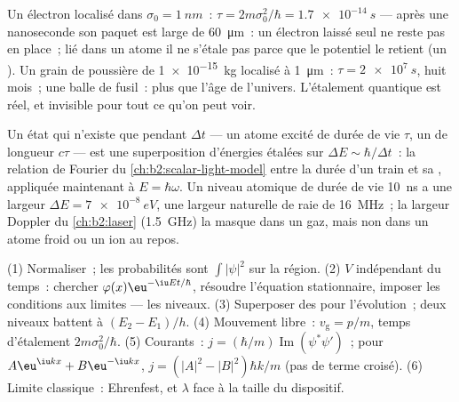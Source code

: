 \begin{example}\label{ex:b2:schrodinger-wave-functions:spreading}
Un électron localisé dans $\sigma_0 = \qty{1}{nm}$~: $\tau = 2m\sigma_0^2/\hbar
= \qty{1.7e-14}{s}$ --- après une nanoseconde son paquet est large de \qty{60}{\micro m}~:
un électron laissé seul ne reste pas en place~; lié dans un atome il
ne s'étale pas parce que le potentiel le retient (un ).
Un grain de poussière de \qty{1e-15}{kg} localisé à \qty{1}{\micro m}~: $\tau =
\qty{2e7}{s}$, huit mois~; une balle de fusil~: plus que l'âge de l'univers.
L'étalement quantique est réel, et invisible pour tout ce qu'on peut voir.
\end{example}

\begin{remark}\label{rem:b2:schrodinger-wave-functions:energytime}
Un état qui n'existe que pendant $\Delta t$ --- un atome excité de durée de vie
$\tau$, un  de longueur $c\tau$ --- est une superposition d'énergies
étalées sur $\Delta E \sim \hbar/\Delta t$~: la relation de Fourier du
\cref{ch:b2:scalar-light-model} entre la durée d'un train et sa
, appliquée maintenant à $E = \hbar\omega$. Un niveau atomique de
durée de vie \qty{10}{ns} a une largeur $\Delta E = \qty{7e-8}{eV}$, une largeur
naturelle de raie de \qty{16}{MHz}~; la largeur Doppler du \cref{ch:b2:laser}
(\qty{1.5}{GHz}) la masque dans un gaz, mais non dans un atome froid ou un ion au
repos.
\end{remark}

\begin{method}\label{meth:b2:schrodinger-wave-functions:method}
(1) Normaliser~; les probabilités sont $\int|\psi|^2$ sur la région. (2)
$V$ indépendant du temps~: chercher $\varphi(x)\eu^{-\iu Et/\hbar}$, résoudre
l'équation stationnaire, imposer les conditions aux limites --- les niveaux.
(3) Superposer des  pour l'évolution~; deux niveaux battent à
$(E_2 - E_1)/h$. (4) Mouvement libre~: $v_{\text{g}} = p/m$, temps d'étalement
$2m\sigma_0^2/\hbar$. (5) Courants~: $j = (\hbar/m)\operatorname{Im}(\psi^*\psi')$~;
pour $A\eu^{\iu kx} + B\eu^{-\iu kx}$, $j = (|A|^2 - |B|^2)\hbar k/m$ (pas de terme croisé).
(6) Limite classique~: Ehrenfest, et $\lambda$ face à la taille du
dispositif.
\end{method}

